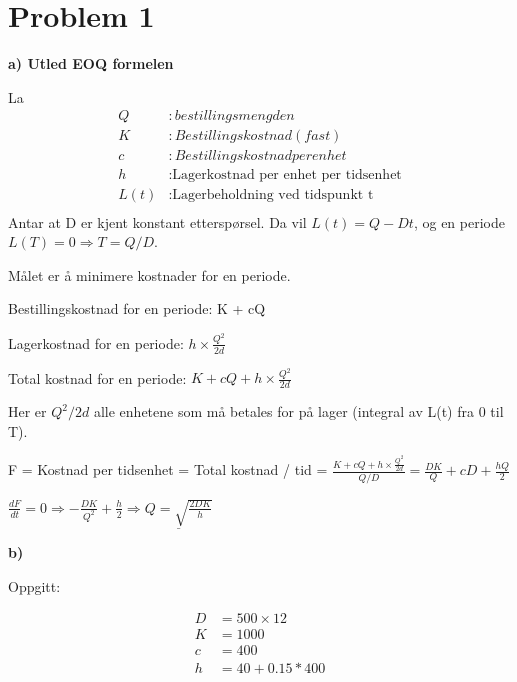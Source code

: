 \documentclass{article}
\begin{document}


\section*{\textbf{Problem 1}}
\vspace*{12pt}\small\textbf{a) Utled EOQ formelen}

La
\begin{align*}
  Q&: bestillingsmengden\\
  K&: Bestillingskostnad (fast)\\
  c&: Bestillingskostnad per enhet\\
  h&: \text{Lagerkostnad per enhet per tidsenhet}\\
  L(t)&: \text{Lagerbeholdning ved tidspunkt t}\\
\end{align*}
Antar at D er kjent konstant etterspørsel. Da vil $L(t) = Q - Dt$, og en periode $L(T) = 0 \Rightarrow T = Q/D$.

Målet er å minimere kostnader for en periode. 
\vspace*{12pt}

Bestillingskostnad for en periode: K + cQ

Lagerkostnad for en periode: $h \times \frac{Q^2}{2d}$

Total kostnad for en periode: $K + cQ + h \times \frac{Q^2}{2d}$

\vspace*{12pt}

Her er $Q^2/2d$ alle enhetene som må betales for på lager (integral av L(t) fra 0 til T). 

\vspace*{12pt}
F = Kostnad per tidsenhet =  Total kostnad / tid = $\frac{K + cQ + h \times \frac{Q^2}{2d}}{Q/D} = \frac{DK}{Q} + cD + \frac{hQ}{2}$

$\frac{dF}{dt} = 0 \Rightarrow -\frac{DK}{Q^2} + \frac{h}{2} \Rightarrow \underline{Q = \sqrt{\frac{2DK}{h}}}$

\vspace*{12pt}\small\textbf{b)}

Oppgitt: 

\begin{align*}
  D &= 500 \times 12 \\
  K &= 1000 \\
  c &= 400 \\
  h &= 40 + 0.15*400 \\
\end{align*}
\end{document}
